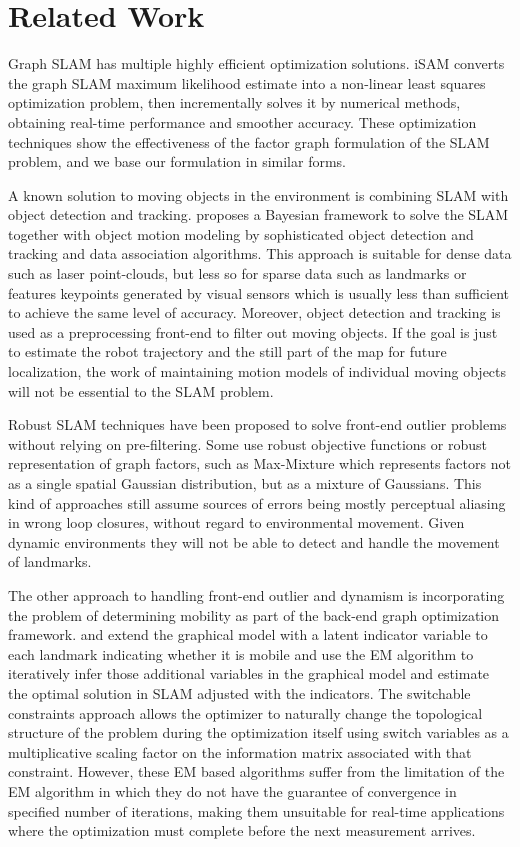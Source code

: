 \section{Related Work}

Graph SLAM has multiple highly efficient optimization solutions.
iSAM\cite{isam} converts the graph SLAM maximum likelihood estimate into a
non-linear least squares optimization problem, then incrementally solves it by
numerical methods, obtaining real-time performance and smoother accuracy. These
optimization techniques show the effectiveness of the factor graph formulation
of the SLAM problem, and we base our formulation in similar forms.

A known solution to moving objects in the environment is combining SLAM with
object detection and tracking. \cite{wang2003online} proposes a Bayesian
framework to solve the SLAM together with object motion modeling by
sophisticated object detection and tracking and data association algorithms.
This approach is suitable for dense data such as laser point-clouds, but less
so for sparse data such as landmarks or features keypoints generated by visual
sensors which is usually less than sufficient to achieve the same level of
accuracy.  Moreover, object detection and tracking is used as a preprocessing
front-end to filter out moving objects. If the goal is just to estimate the
robot trajectory and the still part of the map for future localization, the
work of maintaining motion models of individual moving objects will not be
essential to the SLAM problem. 

Robust SLAM techniques have been proposed to solve front-end outlier problems
without relying on pre-filtering. Some use robust objective functions or robust
representation of graph factors, such as Max-Mixture\cite{mm} which represents
factors not as a single spatial Gaussian distribution, but as a mixture of
Gaussians. This kind of approaches still assume sources of errors being mostly
perceptual aliasing in wrong loop closures, without regard to environmental movement.
Given dynamic environments they will not be able to detect and handle the
movement of landmarks.

The other approach to handling front-end outlier and dynamism is incorporating
the problem of determining mobility as part of the back-end graph optimization
framework.  \cite{haehnel03iros} and \cite{rogers2010slam} extend the graphical
model with a latent indicator variable to each landmark indicating whether it
is mobile and use the EM algorithm to iteratively infer those additional
variables in the graphical model and estimate the optimal solution in SLAM
adjusted with the indicators. The switchable constraints\cite{Switchable12}
approach allows the optimizer to naturally change the topological structure of
the problem during the optimization itself using switch variables as a
multiplicative scaling factor on the information matrix associated with that
constraint. However, these EM based algorithms suffer from the limitation of
the EM algorithm in which they do not have the guarantee of convergence in
specified number of iterations, making them unsuitable for real-time
applications where the optimization must complete before the next measurement
arrives.
